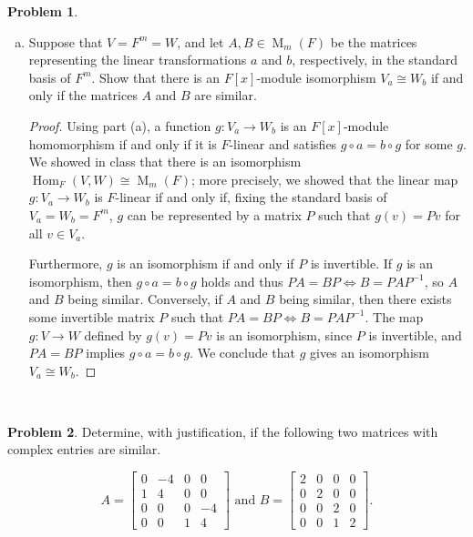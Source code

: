 \documentclass[11pt]{article}
\DeclareMathOperator{\Hom}{Hom}
\DeclareMathOperator{\M}{M}
\theoremstyle{definition}
\newtheorem{problem}{Problem}
\begin{document}
\begin{problem}
\begin{enumerate}[a)]
\item Suppose that $V = F^m = W$, and let $A, B \in \M_m(F)$ be the matrices representing the linear transformations $a$ and $b$, respectively, in the standard basis of $F^m$. Show that there is an $F[x]$-module isomorphism $V_a \cong W_b$ if and only if the matrices $A$ and $B$ are similar.

\begin{proof}
Using part (a), a function $g: V_a \to W_b$ is an $F[x]$-module homomorphism if and only if it is $F$-linear and satisfies $g \circ a = b \circ g$ for some $g$. We showed in class that there is an isomorphism $\Hom_F(V, W) \cong \M_m(F)$; more precisely, we showed that the linear map $g\!:V_a \to W_b$ is $F$-linear if and only if, fixing the standard basis of $V_a = W_b = F^m$, $g$ can be represented by a matrix $P$ such that $g(v)=Pv$ for all $v\in V_a$.

Furthermore, $g$ is an isomorphism if and only if $P$ is invertible. If $g$ is an isomorphism, then $g \circ a =  b \circ g$ holds and thus $PA=BP \iff B=PAP^{-1}$, so $A$ and $B$ being similar. Conversely, if $A$ and $B$ being similar, then there exists some invertible matrix $P$ such that $PA=BP \iff B=PAP^{-1}$. The map $g\!: V \to W$ defined by $g(v) = Pv$ is an isomorphism, since $P$ is invertible, and $PA=BP$ implies $g \circ a =  b \circ g$. We conclude that $g$ gives an isomorphism $V_a \cong W_b$.
\end{proof}

\end{enumerate}
\end{problem}

\

\begin{problem}
	Determine, with justification, if the following two matrices with complex entries are similar.
	
	$$A = \begin{bmatrix}
		0 & -4 & 0 & 0 \\
		1 & 4 & 0 & 0 \\
		0 & 0 & 0 & -4 \\
		0 & 0 & 1 & 4
	\end{bmatrix} \textrm{ and } B = \begin{bmatrix}
		2 & 0 & 0 & 0 \\ 0 & 2 & 0 & 0 \\ 0 & 0 & 2 & 0 \\ 0 & 0 & 1 & 2
	\end{bmatrix}.$$ 
\end{problem}
\end{document}
